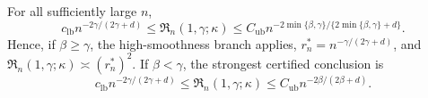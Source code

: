 For all sufficiently large \(n\), \[c_{\mathrm{lb}}n^{-2\gamma/(2\gamma+d)}\le\mathfrak R_n(1,\gamma;\kappa)\le C_{\mathrm{ub}}n^{-2\min\{\beta,\gamma\}/\{2\min\{\beta,\gamma\}+d\}}.\] Hence, if \(\beta\ge\gamma\), the high-smoothness branch applies, \(r_n^*=n^{-\gamma/(2\gamma+d)}\), and \(\mathfrak R_n(1,\gamma;\kappa)\asymp(r_n^*)^2\). If \(\beta<\gamma\), the strongest certified conclusion is \[c_{\mathrm{lb}}n^{-2\gamma/(2\gamma+d)}\le\mathfrak R_n(1,\gamma;\kappa)\le C_{\mathrm{ub}}n^{-2\beta/(2\beta+d)}.\]